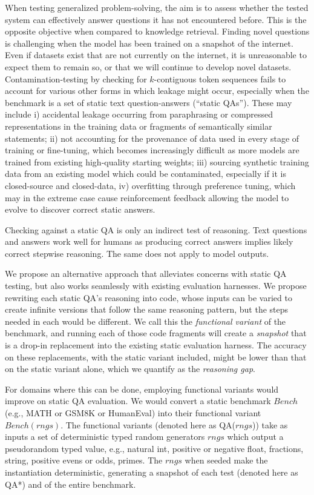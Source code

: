 \documentclass[11pt,a4paper]{article}
\begin{document}
When testing generalized problem-solving, the aim is to assess whether the
tested system can effectively answer questions it has not encountered before.
This is the opposite objective when compared to knowledge retrieval. 
Finding novel questions is challenging when the model has been trained on a
snapshot of the internet. Even if datasets exist that are not currently on the
internet, it is unreasonable to expect them to remain so, or that we will
continue to develop novel datasets. Contamination-testing by checking for
$k$-contiguous token sequences fails to account for various other forms in which
leakage might occur, especially when the benchmark is a set of static text
question-answers (``static QAs''). These may include i) accidental leakage
occurring from paraphrasing or compressed representations in the training data
or fragments of semantically similar statements; ii) not accounting for the
provenance of data used in every stage of training or fine-tuning, which
becomes increasingly difficult as more models are trained from existing
high-quality starting weights; iii) sourcing synthetic training data from an
existing model which could be contaminated, especially if it is closed-source
and closed-data, iv) overfitting through preference tuning, which may in the
extreme case cause reinforcement feedback allowing the model to evolve to
discover correct static answers.

Checking against a static QA is only an indirect test of reasoning. Text
questions and answers work well for humans as producing correct answers
implies likely correct stepwise reasoning.  The same does not apply to model
outputs.

We propose an alternative approach that alleviates concerns with static QA
testing, but also works seamlessly with existing evaluation harnesses. We
propose rewriting each static QA's reasoning into code, whose inputs can be
varied to create infinite versions that follow the same reasoning pattern, but
the steps needed in each would be different. We call this the {\em functional
variant} of the benchmark, and running each of those code fragments will create
a {\em snapshot} that is a drop-in replacement into the existing static
evaluation harness.  The accuracy on these replacements, with the static
variant included, might be lower than that on the static variant alone, which
we quantify as the {\em reasoning gap}.

For domains where this can be done, employing functional variants would improve
on static QA evaluation. We would convert a static benchmark $Bench$
(e.g., MATH or GSM8K or HumanEval) into their functional variant
$Bench(rngs)$. The functional variants (denoted here as QA($rngs$)) take as
inputs a set of deterministic typed random generators $rngs$ which output a
pseudorandom typed value, e.g., natural int, positive or negative float,
fractions, string, positive evens or odds, primes. The $rngs$ when seeded make
the instantiation deterministic, generating a snapshot of each test
(denoted here as QA*) and of the entire benchmark.
\end{document}
